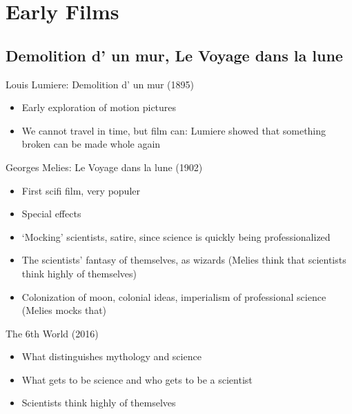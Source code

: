 \documentclass[11pt,fleqn]{book}
\begin{document}
\section{Early Films}
\subsection{Demolition d’ un mur, Le Voyage dans la lune}
\begin{descriptions}
    \item[Louis Lumiere: Demolition d’ un mur (1895)]
    \begin{descriptions}
    \end{descriptions}
    \begin{itemize}
        \item Early exploration of motion pictures
        \item We cannot travel in time, but film can: Lumiere showed that something broken can be made whole again
    \end{itemize}
    \item[Georges Melies: Le Voyage dans la lune (1902)] 
    \begin{descriptions}
    \end{descriptions}
    \begin{itemize}
        \item First scifi film, very populer
        \item Special effects
        \item ‘Mocking’ scientists, satire, since science is quickly being professionalized
        \item The scientists’ fantasy of themselves, as wizards (Melies think that scientists think highly of themselves)
        \item Colonization of moon, colonial ideas, imperialism of professional science (Melies mocks that)
    \end{itemize}
    \item[The 6th World (2016)]
    \begin{descriptions}
    \end{descriptions}
    \begin{itemize}
        \item What distinguishes mythology and science
        \item What gets to be science and who gets to be a scientist
        \item Scientists think highly of themselves
    \end{itemize}
\end{descriptions}
\end{document}
